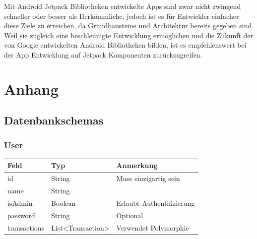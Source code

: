 \documentclass[a4paper, 11pt]{article}
\begin{document}
Mit Android Jetpack Bibliotheken entwickelte Apps sind zwar nicht zwingend schneller oder besser als Herkömmliche, jedoch ist es für Entwickler einfacher diese Ziele zu erreichen, da Grundbausteine und Architektur bereits gegeben sind.
Weil sie zugleich eine beschleunigte Entwicklung ermöglichen und die Zukunft der von Google entwickelten Android Bibliotheken bilden, ist es empfehlenswert bei der App Entwicklung auf Jetpack Komponenten zurückzugreifen.

\newpage
\begingroup
\raggedright
\printbibliography[title={Referenzen}, keyword=citations]
\nocite{*}
\newrefcontext[sorting=nty]
\printbibliography[title={Dokumentation}, keyword=sources, env=sources]
\endgroup

\newpage
\section*{Anhang}
\label{sec:attachments}

\subsection*{Datenbankschemas}
\label{subsec:attachments:schemas}

\subsubsection*{User}
\label{subsubsec:attachments:schemas:user}
\begin{table}[H]
	\centering
	\begin{tabular}{@{}lll@{}}
		Feld         & Typ                                      & Anmerkung             \\ \toprule
		id           & String                                   & Muss einzigartig sein \\ \midrule
		name         & String                                   &                       \\ \midrule
		isAdmin      & Boolean                                  & Erlaubt Authentifizierung \\ \midrule
		password     & String                                   & Optional              \\ \midrule
		transactions & List\textless{}Transaction\textgreater{} & Verwendet Polymorphie \\ \bottomrule
	\end{tabular}
	\label{tab:attachments:schemas:user}
\end{table}
\end{document}
